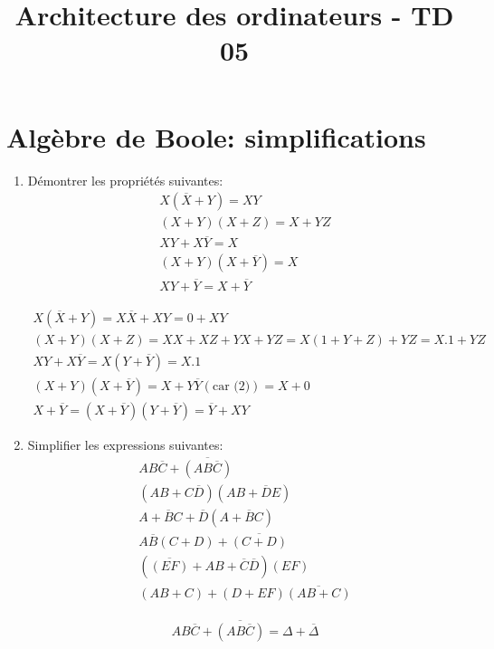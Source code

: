 \documentclass[a4paper,10pt]{exam}
\title{Architecture des ordinateurs - TD 05}
\author{}
\date{}
\begin{document}
\maketitle

\section{Algèbre de Boole: simplifications}
\begin{enumerate}
  \item Démontrer les propriétés suivantes:
    \begin{align}
      X(\overline{X} + Y) = XY \\
      (X+Y)(X+Z) = X + YZ \\
      XY + X\overline{Y} = X \\
      (X+Y)(X+\overline{Y}) = X \\
      XY + \overline{Y} = X + \overline{Y}
    \end{align}
    \begin{solution}
      \begin{align*}
        X(\overline{X} + Y) = X\overline{X} + XY = 0 + XY \\
        (X+Y)(X+Z) = XX + XZ + YX + YZ = X(1 + Y + Z) + YZ = X.1 + YZ \\
        XY + X\overline{Y} = X(Y + \overline{Y}) = X.1 \\
        (X+Y)(X+\overline{Y}) = X + Y\overline{Y} (\textrm{car (2)}) = X + 0\\
        X + \overline{Y} = (X + \overline{Y})(Y + \overline{Y}) = \overline{Y} + XY
      \end{align*}
    \end{solution}
  \item Simplifier les expressions suivantes:
    \begin{align}
      AB\overline{C} + \overline{(AB\overline{C})}\\
      (AB + C\overline{D})(AB + \overline{D}E)\\
      A + \overline{B}C + \overline{D}(A+\overline{B}C)\\
      A\overline{B}(C + D) + \overline{(C + D)}\\
      (\overline{(EF)} + AB + \overline{C}\overline{D})(EF)\\
      (AB + C) + (D + EF)\overline{(AB + C)}
  \end{align}
  \begin{solution}
    \begin{align*}
      AB\overline{C} + \overline{(AB\overline{C})} = \Delta + \overline{\Delta}

\end{align*}
\end{solution}
\end{enumerate}
\end{document}
